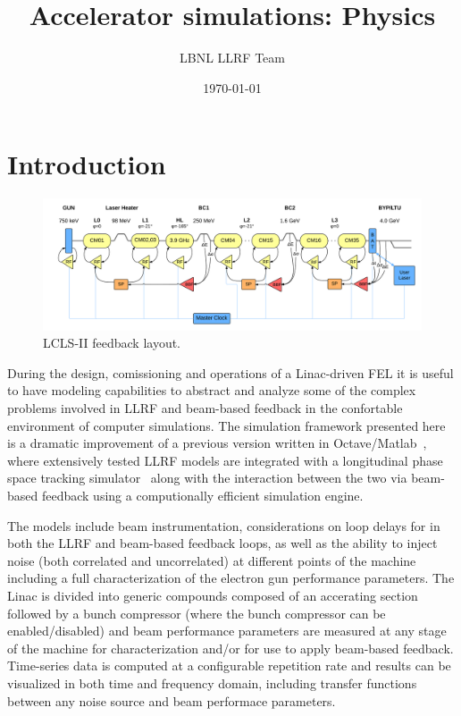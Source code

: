 \documentclass[a4paper,12pt]{article}
\title{Accelerator simulations: Physics}
\author{LBNL LLRF Team}
\date{\today}
\begin{document}
\maketitle
\setcounter{tocdepth}{3}
\tableofcontents

\newpage

\section{Introduction}

\begin{figure}
\centering
\includegraphics[scale=0.11]{../figures/LCLS-II_feedback_layout.png}
\caption{LCLS-II feedback layout.}
\label{fig:lclsII-feedback_layout}
\end{figure}

During the design, comissioning and operations of a Linac-driven FEL it is useful to have modeling capabilities to abstract and analyze some of the complex problems involved in LLRF and beam-based feedback in the confortable environment of computer simulations. The simulation framework presented here is a dramatic improvement of a previous version written in Octave/Matlab~\cite{ref:model-paper}, where extensively tested LLRF models are integrated with a longitudinal phase space tracking simulator~\cite{ref:litrack} along with the interaction between the two via beam-based feedback using a computionally efficient simulation engine. 

The models include beam instrumentation, considerations on loop delays for in both the LLRF and beam-based feedback loops, as well as the ability to inject noise (both correlated and uncorrelated) at different points of the machine including a full characterization of the electron gun performance parameters. The Linac is divided into generic compounds composed of an accerating section followed by a bunch compressor (where the bunch compressor can be enabled/disabled) and beam performance parameters are measured at any stage of the machine for characterization and/or for use to apply beam-based feedback. Time-series data is computed at a configurable repetition rate and results can be visualized in both time and frequency domain, including transfer functions between any noise source and beam performace parameters.
\end{document}
